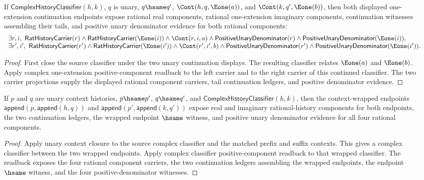 \begin{theorem}
\label{thm:complex-history-classifier-unary-continuation-e1-endpoint-positive-components}
If $\mathsf{ComplexHistoryClassifier}(h,k)$, $q$ is unary,
$q\hsame q'$, $\Cont(h,q,\Eone(a))$, and $\Cont(k,q',\Eone(b))$, then both
displayed one-extension continuation endpoints expose rational real
components, rational one-extension imaginary components, continuation
witnesses assembling their tails, and positive unary denominator evidence for
both rational components:
$$
\begin{array}{l}
\exists r,i,\ \mathsf{RatHistoryCarrier}(r)\land
\mathsf{RatHistoryCarrier}(\Eone(i))\land \Cont(r,i,a)\land
\mathsf{PositiveUnaryDenominator}(r)\land
\mathsf{PositiveUnaryDenominator}(\Eone(i)),\\
\exists r',i',\ \mathsf{RatHistoryCarrier}(r')\land
\mathsf{RatHistoryCarrier}(\Eone(i'))\land \Cont(r',i',b)\land
\mathsf{PositiveUnaryDenominator}(r')\land
\mathsf{PositiveUnaryDenominator}(\Eone(i')).
\end{array}
$$
\end{theorem}
\begin{proof}
First close the source classifier under the two unary continuation displays.
The resulting classifier relates \(\Eone(a)\) and \(\Eone(b)\). Apply complex
one-extension positive-component readback to the left carrier and to the right
carrier of this continued classifier. The two carrier projections supply the
displayed rational component carriers, tail continuation ledgers, and positive
denominator evidence.
\end{proof}

\begin{theorem}
\label{thm:complex-history-classifier-unary-context-positive-components}
If \(p\) and \(q\) are unary context histories, \(p\hsame p'\),
\(q\hsame q'\), and \(\mathsf{ComplexHistoryClassifier}(h,k)\), then the
context-wrapped endpoints
\(\mathsf{append}(p,\mathsf{append}(h,q))\) and
\(\mathsf{append}(p',\mathsf{append}(k,q'))\) expose real and imaginary
rational-history components for both endpoints, the two continuation ledgers,
the wrapped endpoint \(\hsame\) witness, and positive unary denominator
evidence for all four rational components.
\end{theorem}
\begin{proof}
Apply unary context closure to the source complex classifier and the matched
prefix and suffix contexts. This gives a complex classifier between the two
wrapped endpoints. Apply complex classifier positive-component readback to that
wrapped classifier. The readback exposes the four rational component carriers,
the two continuation ledgers assembling the wrapped endpoints, the endpoint
\(\hsame\) witness, and the four positive-denominator witnesses.
\end{proof}

